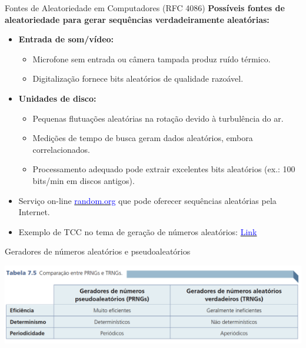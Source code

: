 \begin{frame}{Fontes de Aleatoriedade em Computadores (RFC 4086)}
    \textbf{Possíveis fontes de aleatoriedade para gerar sequências verdadeiramente aleatórias:}

    \begin{itemize}
        \item \textbf{Entrada de som/vídeo:}
              \begin{itemize}
                  \item Microfone sem entrada ou câmera tampada produz ruído térmico.
                  \item Digitalização fornece bits aleatórios de qualidade razoável.
              \end{itemize}
        \item \textbf{Unidades de disco:}
              \begin{itemize}
                  \item Pequenas flutuações aleatórias na rotação devido à turbulência do ar.
                  \item Medições de tempo de busca geram dados aleatórios, embora correlacionados.
                  \item Processamento adequado pode extrair excelentes bits aleatórios (ex.: 100 bits/min em discos antigos).
              \end{itemize}
        \item Serviço on-line \href{http://random.org}{\textcolor{blue}{random.org}} que pode oferecer sequências aleatórias pela Internet.

        \item Exemplo de TCC no tema de geração de números aleatórios: \href{https://lume.ufrgs.br/handle/10183/251751}{\textcolor{blue}{Link}}
    \end{itemize}
\end{frame}


\begin{frame}{Geradores de números aleatórios e pseudoaleatórios}

    \centering
    \includegraphics[width=0.9\linewidth]{Figuras/tabelaprngtrng.png}


\end{frame}

